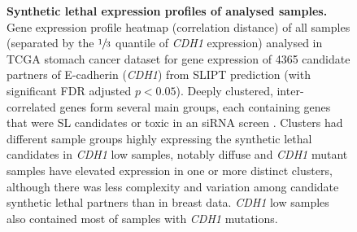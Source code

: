 \begin{figure}[!ht]
  \centering
    \caption[Synthetic lethal expression profiles of stomach samples]{\small \textbf{Synthetic lethal expression profiles of analysed samples.} Gene expression profile heatmap (correlation distance) of all samples (separated by the $\sfrac{1}{3}$ quantile of \textit{CDH1} expression) analysed in \gls{TCGA} stomach cancer dataset for gene expression of 4365 candidate partners of \gls{E-cadherin} (\textit{CDH1}) from \gls{SLIPT} prediction (with significant \gls{FDR} adjusted $p < 0.05$). Deeply clustered, inter-correlated genes form several main groups, each containing genes that were SL candidates or toxic in an \gls{siRNA} screen \cite{Telford2015}. Clusters had different sample groups highly expressing the synthetic lethal candidates in \textit{CDH1} low samples, notably diffuse and \textit{CDH1} mutant samples have elevated expression in one or more distinct clusters, although there was less complexity and variation among candidate synthetic lethal partners than in breast data. \textit{CDH1} low samples also contained most of samples with \textit{CDH1} mutations.
}
\label{fig:slipt_expr_stad}
\end{figure}

